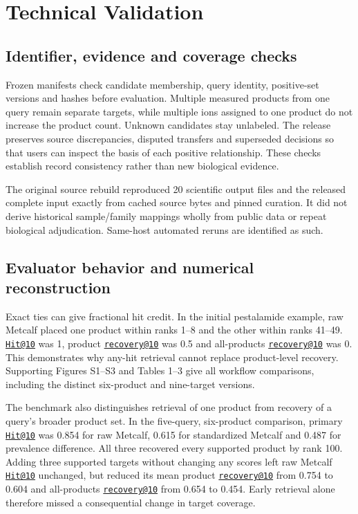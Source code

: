 \documentclass[
  10pt,
  a4paper,
]{article}
\begin{document}
\section{Technical Validation}\label{technical-validation}

\subsection{Identifier, evidence and coverage checks}\label{identifier-evidence-and-coverage-checks}

Frozen manifests check candidate membership, query identity, positive-set versions and hashes before evaluation. Multiple measured products from one query remain separate targets, while multiple ions assigned to one product do not increase the product count. Unknown candidates stay unlabeled. The release preserves source discrepancies, disputed transfers and superseded decisions so that users can inspect the basis of each positive relationship. These checks establish record consistency rather than new biological evidence.

The original source rebuild reproduced 20 scientific output files and the released complete input exactly from cached source bytes and pinned curation. It did not derive historical sample/family mappings wholly from public data or repeat biological adjudication. Same-host automated reruns are identified as such.

\subsection{Evaluator behavior and numerical reconstruction}\label{evaluator-behavior-and-numerical-reconstruction}

Exact ties can give fractional hit credit. In the initial pestalamide example, raw Metcalf placed one product within ranks 1--8 and the other within ranks 41--49. \href{mailto:Hit@10}{\nolinkurl{Hit@10}} was 1, product \href{mailto:recovery@10}{\nolinkurl{recovery@10}} was 0.5 and all-products \href{mailto:recovery@10}{\nolinkurl{recovery@10}} was 0. This demonstrates why any-hit retrieval cannot replace product-level recovery. Supporting Figures S1--S3 and Tables 1--3 give all workflow comparisons, including the distinct six-product and nine-target versions.

The benchmark also distinguishes retrieval of one product from recovery of a query's broader product set. In the five-query, six-product comparison, primary \href{mailto:Hit@10}{\nolinkurl{Hit@10}} was 0.854 for raw Metcalf, 0.615 for standardized Metcalf and 0.487 for prevalence difference. All three recovered every supported product by rank 100. Adding three supported targets without changing any scores left raw Metcalf \href{mailto:Hit@10}{\nolinkurl{Hit@10}} unchanged, but reduced its mean product \href{mailto:recovery@10}{\nolinkurl{recovery@10}} from 0.754 to 0.604 and all-products \href{mailto:recovery@10}{\nolinkurl{recovery@10}} from 0.654 to 0.454. Early retrieval alone therefore missed a consequential change in target coverage.
\end{document}
